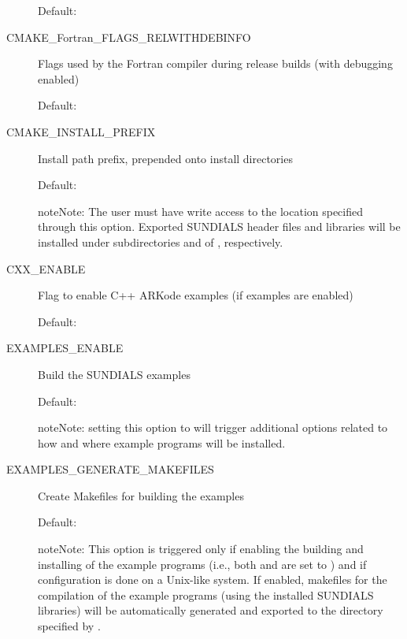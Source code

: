 \documentclass[letterpaper,10pt,english]{sphinxmanual}
\begin{document}
\begin{description}
Default: 

\item[{\index{CMAKE\_Fortran\_FLAGS\_RELWITHDEBINFO (CMake option)}CMAKE\_Fortran\_FLAGS\_RELWITHDEBINFO}] \leavevmode
Flags used by the Fortran compiler during release builds (with
debugging enabled)

Default: 

\item[{\index{CMAKE\_INSTALL\_PREFIX (CMake option)}CMAKE\_INSTALL\_PREFIX}] \leavevmode
Install path prefix, prepended onto install
directories

Default: 

\begin{notice}{note}{Note:}
The user must have write access to the location specified
through this option. Exported SUNDIALS header files and libraries
will be installed under subdirectories  and  of
, respectively.
\end{notice}

\item[{\index{CXX\_ENABLE (CMake option)}CXX\_ENABLE}] \leavevmode
Flag to enable C++ ARKode examples (if examples are enabled)

Default: 

\item[{\index{EXAMPLES\_ENABLE (CMake option)}EXAMPLES\_ENABLE}] \leavevmode
Build the SUNDIALS examples

Default: 

\begin{notice}{note}{Note:}
setting this option to  will trigger additional options
related to how and where example programs will be installed.
\end{notice}

\item[{\index{EXAMPLES\_GENERATE\_MAKEFILES (CMake option)}EXAMPLES\_GENERATE\_MAKEFILES}] \leavevmode
Create Makefiles for building the examples

Default: 

\begin{notice}{note}{Note:}
This option is triggered only if enabling the building and
installing of the example programs (i.e., both 
and  are set to ) and if configuration is
done on a Unix-like system. If enabled, makefiles for the
compilation of the example programs (using the installed SUNDIALS
libraries) will be automatically generated and exported to the
directory specified by .
\end{notice}


\end{description}
\end{document}
